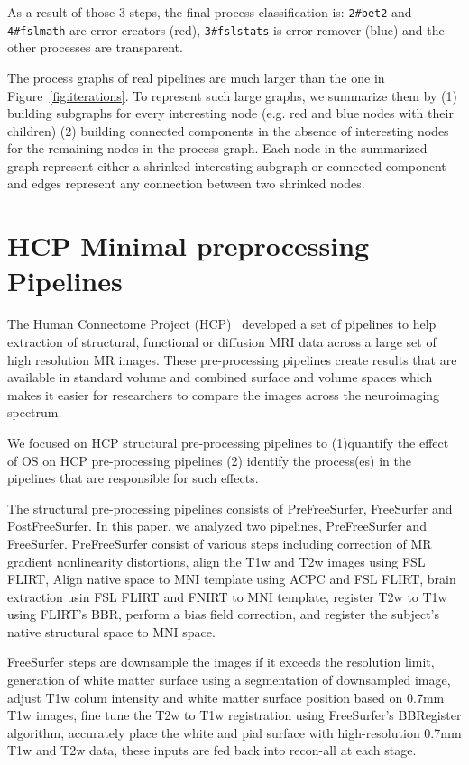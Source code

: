 \documentclass{article}
\begin{document}
{As a result of those 3 steps, the final process classification is: 
\texttt{2\#bet2} and \texttt{4\#fslmath} are error creators (red), 
\texttt{3\#fslstats} is error remover (blue) and the other processes 
are transparent.

The process graphs of real pipelines are much larger than the one in 
Figure~\ref{fig:iterations}. To represent such large graphs, we 
summarize them by (1) building subgraphs for every interesting node 
(e.g. red and blue nodes with their children) (2) building connected 
components in the absence of interesting nodes for the remaining nodes 
in the process graph. Each node in the summarized graph represent 
either a shrinked interesting subgraph or connected component and edges 
represent any connection between two shrinked nodes.


\section{HCP Minimal preprocessing Pipelines}

The Human Connectome Project (HCP)~\cite{glasser2013minimal} developed 
a set of pipelines to help extraction of structural, functional or 
diffusion MRI data across a large set of high resolution MR images. 
These pre-processing pipelines create results that are available in 
standard volume and combined surface and volume spaces which makes it 
easier for researchers to compare the images across the neuroimaging 
spectrum. 

We focused on HCP structural pre-processing pipelines to (1)quantify 
the effect of OS on HCP pre-processing pipelines (2) identify the 
process(es) in the pipelines that are responsible for such effects.

The structural pre-processing pipelines consists of PreFreeSurfer, 
FreeSurfer and PostFreeSurfer. In this paper, 
we analyzed two pipelines, PreFreeSurfer and FreeSurfer. 
PreFreeSurfer consist of various steps including correction of MR 
gradient nonlinearity distortions, align the T1w and T2w images using 
FSL FLIRT, Align native space to MNI template using ACPC and FSL FLIRT, 
brain extraction usin FSL FLIRT and FNIRT to MNI template, register T2w 
to T1w using FLIRT's BBR, perform a bias field correction, and register 
the subject's native structural space to MNI space. 

FreeSurfer steps are downsample the images if it exceeds the resolution 
limit, generation of white matter surface using a segmentation of 
downsampled image, adjust T1w colum intensity and white matter surface 
position based on 0.7mm T1w images, fine tune the T2w to T1w 
registration using FreeSurfer's BBRegister algorithm, accurately place 
the white and pial surface with high-resolution 0.7mm T1w and T2w data, 
these inputs are fed back into recon-all at each stage. 

}
\end{document}

